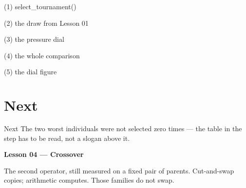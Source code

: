 \begin{frame}[fragile]{(1) select\_tournament()}

\end{frame}

\begin{frame}[fragile]{(2) the draw from Lesson 01}

\end{frame}

\begin{frame}[fragile]{(3) the pressure dial}

\end{frame}

\begin{frame}[fragile]{(4) the whole comparison}

\end{frame}

\begin{frame}[fragile]{(5) the dial figure}

\end{frame}


\section{Next}

\begin{frame}{Next}
The two worst individuals were not selected zero times --- the table in the step has to be read, not a slogan above it.

\vspace{0.8em}
\textbf{Lesson 04 --- Crossover}

The second operator, still measured on a fixed pair of parents. Cut-and-swap copies; arithmetic computes. Those families do not swap.
\end{frame}

